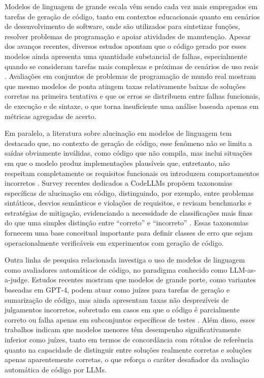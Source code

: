 \documentclass[conference]{IEEEtran}
\begin{document}
Modelos de linguagem de grande escala vêm sendo cada vez mais empregados em tarefas de geração de código, tanto em contextos educacionais quanto em cenários de desenvolvimento de software, onde são utilizados para sintetizar funções, resolver problemas de programação e apoiar atividades de manutenção. Apesar dos avanços recentes, diversos estudos apontam que o código gerado por esses modelos ainda apresenta uma quantidade substancial de falhas, especialmente quando se consideram tarefas mais complexas e próximas de cenários de uso reais \cite{2407.06153,2108.07732}. Avaliações em conjuntos de problemas de programação de mundo real mostram que mesmo modelos de ponta atingem taxas relativamente baixas de soluções corretas na primeira tentativa e que os erros se distribuem entre falhas funcionais, de execução e de sintaxe, o que torna insuficiente uma análise baseada apenas em métricas agregadas de acerto.

Em paralelo, a literatura sobre alucinação em modelos de linguagem tem destacado que, no contexto de geração de código, esse fenômeno não se limita a saídas obviamente inválidas, como código que não compila, mas inclui situações em que o modelo produz implementações plausíveis que, entretanto, não respeitam completamente os requisitos funcionais ou introduzem comportamentos incorretos \cite{2504.20799}. Survey recentes dedicados a CodeLLMs propõem taxonomias específicas de alucinação em código, distinguindo, por exemplo, entre problemas sintáticos, desvios semânticos e violações de requisitos, e revisam benchmarks e estratégias de mitigação, evidenciando a necessidade de classificações mais finas do que uma simples distinção entre “correto” e “incorreto” \cite{2504.20799,2408.08333,2410.09997}. Essas taxonomias fornecem uma base conceitual importante para definir classes de erro que sejam operacionalmente verificáveis em experimentos com geração de código.

Outra linha de pesquisa relacionada investiga o uso de modelos de linguagem como avaliadores automáticos de código, no paradigma conhecido como LLM-as-a-judge. Estudos recentes mostram que modelos de grande porte, como variantes baseadas em GPT-4, podem atuar como juízes para tarefas de geração e sumarização de código, mas ainda apresentam taxas não desprezíveis de julgamentos incorretos, sobretudo em casos em que o código é parcialmente correto ou falha apenas em subconjuntos específicos de testes \cite{2507.16587}. Além disso, esses trabalhos indicam que modelos menores têm desempenho significativamente inferior como juízes, tanto em termos de concordância com rótulos de referência quanto na capacidade de distinguir entre soluções realmente corretas e soluções apenas aparentemente corretas, o que reforça o caráter desafiador da avaliação automática de código por LLMs.
\end{document}
